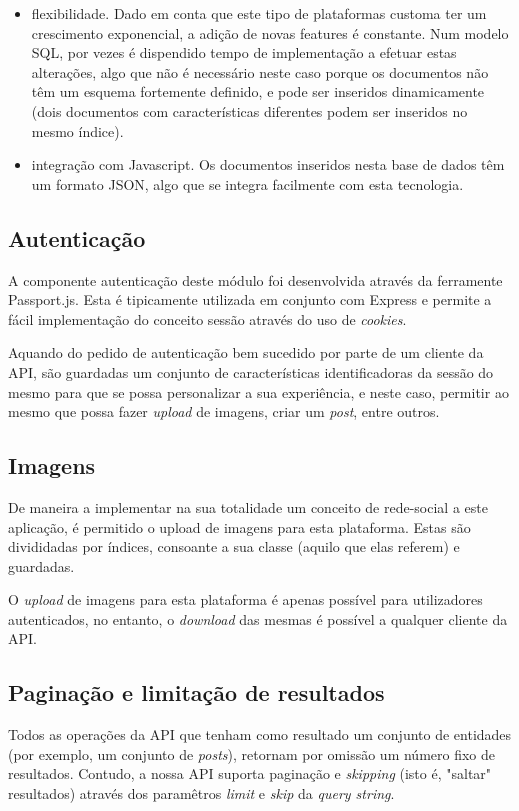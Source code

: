 \begin{itemize}
	\item flexibilidade. Dado em conta que este tipo de plataformas customa ter um crescimento exponencial, a adição de novas features é constante. Num modelo SQL, por vezes é dispendido tempo de implementação a efetuar estas alterações, algo que não é necessário neste caso porque os documentos não têm um esquema fortemente definido, e pode ser inseridos dinamicamente (dois documentos com características diferentes podem ser inseridos no mesmo índice).
	\item integração com Javascript. Os documentos inseridos nesta base de dados têm um formato JSON, algo que se integra facilmente com esta tecnologia.
\end{itemize} 

\subsection{Autenticação}
A componente autenticação deste módulo foi desenvolvida através da ferramente Passport.js. Esta é tipicamente utilizada em conjunto com Express e permite a fácil implementação do conceito sessão através do uso de \textit{cookies}. \par \medskip

Aquando do pedido de autenticação bem sucedido por parte de um cliente da API, são guardadas um conjunto de características identificadoras da sessão do mesmo para que se possa personalizar a sua experiência, e neste caso, permitir ao mesmo que possa fazer \textit{upload} de imagens, criar um \textit{post}, entre outros. \par \medskip

\subsection{Imagens}
De maneira a implementar na sua totalidade um conceito de rede-social a este aplicação, é permitido o upload de imagens para esta plataforma. Estas são divididadas por índices, consoante a sua classe (aquilo que elas referem) e guardadas. \par \medskip

O \textit{upload} de imagens para esta plataforma é apenas possível para utilizadores autenticados, no entanto, o \textit{download} das mesmas é possível a qualquer cliente da API.

\subsection{Paginação e limitação de resultados}
Todos as operações da API que tenham como resultado um conjunto de entidades (por exemplo, um conjunto de \textit{posts}), retornam por omissão um número fixo de resultados. Contudo, a nossa API suporta paginação e \textit{skipping} (isto é, "saltar" resultados) através dos paramêtros \textit{limit} e \textit{skip} da \textit{query string}.


